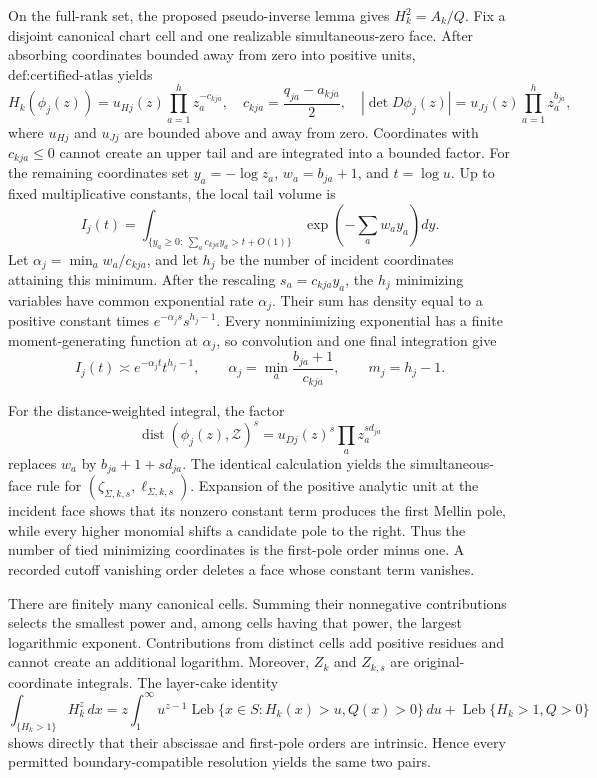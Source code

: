 On the full-rank set, the proposed pseudo-inverse lemma gives \(H_k^2=A_k/Q\). Fix a disjoint canonical chart cell and one realizable simultaneous-zero face. After absorbing coordinates bounded away from zero into positive units, \(\text{def:certified-atlas}\) yields
\[
H_k(\phi_j(z))
=u_{Hj}(z)\prod_{a=1}^h z_a^{-c_{kja}},
\quad
c_{kja}=\frac{q_{ja}-a_{kja}}2,
\quad
|\det D\phi_j(z)|=u_{Jj}(z)\prod_{a=1}^h z_a^{b_{ja}},
\]
where \(u_{Hj}\) and \(u_{Jj}\) are bounded above and away from zero. Coordinates with \(c_{kja}\le0\) cannot create an upper tail and are integrated into a bounded factor. For the remaining coordinates set \(y_a=-\log z_a\), \(w_a=b_{ja}+1\), and \(t=\log u\). Up to fixed multiplicative constants, the local tail volume is
\[
I_j(t)=\int_{\{y_a\ge0:\ \sum_ac_{kja}y_a>t+O(1)\}}
\exp\!\left(-\sum_aw_ay_a\right)dy.
\]
Let \(\alpha_j=\min_a w_a/c_{kja}\), and let \(h_j\) be the number of incident coordinates attaining this minimum. After the rescaling \(s_a=c_{kja}y_a\), the \(h_j\) minimizing variables have common exponential rate \(\alpha_j\). Their sum has density equal to a positive constant times \(e^{-\alpha_j s}s^{h_j-1}\). Every nonminimizing exponential has a finite moment-generating function at \(\alpha_j\), so convolution and one final integration give
\[
I_j(t)\asymp e^{-\alpha_jt}t^{h_j-1},
\qquad
\alpha_j=\min_a\frac{b_{ja}+1}{c_{kja}},
\qquad m_j=h_j-1.
\]

For the distance-weighted integral, the factor
\[
\operatorname{dist}(\phi_j(z),\mathcal Z)^s
=u_{Dj}(z)^s\prod_a z_a^{s d_{ja}}
\]
replaces \(w_a\) by \(b_{ja}+1+s d_{ja}\). The identical calculation yields the simultaneous-face rule for \((\zeta_{\Sigma,k,s},\ell_{\Sigma,k,s})\). Expansion of the positive analytic unit at the incident face shows that its nonzero constant term produces the first Mellin pole, while every higher monomial shifts a candidate pole to the right. Thus the number of tied minimizing coordinates is the first-pole order minus one. A recorded cutoff vanishing order deletes a face whose constant term vanishes.

There are finitely many canonical cells. Summing their nonnegative contributions selects the smallest power and, among cells having that power, the largest logarithmic exponent. Contributions from distinct cells add positive residues and cannot create an additional logarithm. Moreover, \(Z_k\) and \(Z_{k,s}\) are original-coordinate integrals. The layer-cake identity
\[
\int_{\{H_k>1\}}H_k^z\,dx
=z\int_1^\infty u^{z-1}\operatorname{Leb}\{x\in S:H_k(x)>u,Q(x)>0\}\,du
+\operatorname{Leb}\{H_k>1,Q>0\}
\]
shows directly that their abscissae and first-pole orders are intrinsic. Hence every permitted boundary-compatible resolution yields the same two pairs.

